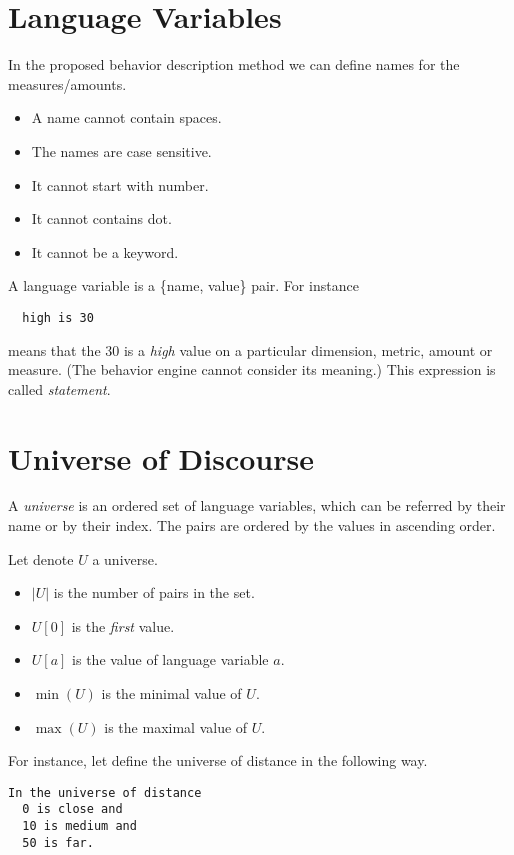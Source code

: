 \documentclass[a4paper,12pt]{article}
\begin{document}
\section{Language Variables}

In the proposed behavior description method we can define names for the measures/amounts.
\begin{itemize}
    \item A name cannot contain spaces.
    \item The names are case sensitive.
    \item It cannot start with number.
    \item It cannot contains dot.
    \item It cannot be a keyword.
\end{itemize}
A language variable is a \{name, value\} pair.
For instance
\begin{verbatim}
  high is 30
\end{verbatim}
means that the 30 is a \emph{high} value on a particular dimension, metric, amount or measure.
(The behavior engine cannot consider its meaning.)
This expression is called \textit{statement}.

\section{Universe of Discourse}

A \textit{universe} is an ordered set of language variables, which can be referred by their name or by their index. The pairs are ordered by the values in ascending order.

Let denote $U$ a universe.
\begin{itemize}
    \item $|U|$ is the number of pairs in the set.
    \item $U[0]$ is the \emph{first} value.
    \item $U[a]$ is the value of language variable $a$.
    \item $\min(U)$ is the minimal value of $U$.
    \item $\max(U)$ is the maximal value of $U$.
\end{itemize}

For instance, let define the universe of distance in the following way.

\begin{verbatim}
In the universe of distance
  0 is close and
  10 is medium and
  50 is far.
\end{verbatim}
\end{document}
